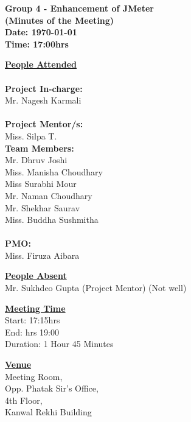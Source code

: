 \documentclass[a4paper,12pt]{article}
\begin{document}
\LARGE
\begin{center}
\textbf
{
Group 4 - Enhancement of JMeter\\
(Minutes of the Meeting) \\ 
Date: \today \\
Time: 17:00hrs
}
\end{center}

\vfill

\large

\underline{\textbf{People Attended}} \\ 
\\
\indent \textbf{Project In-charge:} \\
\indent Mr. Nagesh Karmali \\
\\
\indent \textbf{Project Mentor/s:} \\
\indent Miss. Silpa T. \\
\vfill
\indent \textbf{Team Members:} \\
\indent Mr. Dhruv Joshi \\
\indent Miss. Manisha Choudhary \\
\indent Miss Surabhi Mour \\
\indent Mr. Naman Choudhary \\
\indent Mr. Shekhar Saurav \\
\indent Miss. Buddha Sushmitha \\
\\
\indent \textbf{PMO:} \\
\indent Miss. Firuza Aibara\\

\vfill

\underline{\textbf{People Absent}} \\ 
\indent Mr. Sukhdeo Gupta (Project Mentor) (Not well)
\vfill

\underline{\textbf{Meeting Time}} \\
\indent Start: 17:15hrs \\
\indent End: hrs 19:00\\
\indent Duration: 1 Hour 45 Minutes \\

\vfill

\underline{\textbf{Venue}} \\
\indent Meeting Room, \\ 
\indent Opp. Phatak Sir's Office,\\ 
\indent 4th Floor, \\
\indent Kanwal Rekhi Building
\end{document}
